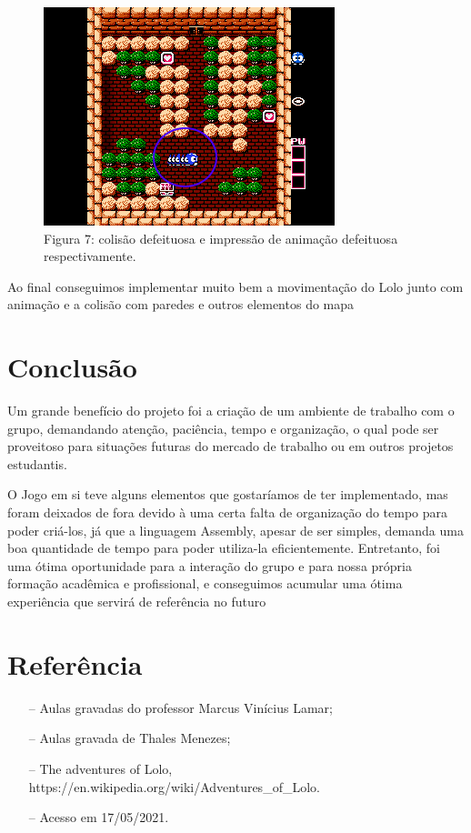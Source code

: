 \documentclass[10pt, conference, compsocconf]{IEEEtran}
\begin{document}
\begin{figure}[htb]
  \begin{center}
   \includegraphics[width=0.3\linewidth]{./Figures/image_10.png}
  \end{center}
  \caption{Figura 7: colisão defeituosa e impressão
de animação defeituosa respectivamente.}
  \label{fig:01}
\end{figure}

Ao final conseguimos implementar muito bem a movimentação do Lolo junto com animação e a colisão com
paredes e outros elementos do mapa

\section{Conclusão}
Um grande benefício do projeto foi a criação de
um ambiente de trabalho com o grupo, demandando
atenção, paciência, tempo e organização, o qual pode
ser proveitoso para situações futuras do mercado de
trabalho ou em outros projetos estudantis.

O Jogo em si teve alguns elementos que
gostaríamos de ter implementado, mas foram deixados de fora devido à uma certa falta de organização do tempo para poder criá-los, já que a linguagem
Assembly, apesar de ser simples, demanda uma boa
quantidade de tempo para poder utiliza-la eficientemente. Entretanto, foi uma ótima oportunidade
para a interação do grupo e para nossa própria formação acadêmica e profissional, e conseguimos acumular uma ótima experiência que servirá de referência no futuro


\section{Referência}
\label{sec:Conclusao}
\begin{itemize}
    \item[--] Aulas gravadas do professor Marcus Vinícius Lamar;
    \item[--] Aulas gravada de Thales Menezes;
    \item[--] The adventures of Lolo, https://en.wikipedia.org/wiki/Adventures_of_Lolo.
    \item[--] Acesso em 17/05/2021.
    
\end{itemize}



%


\end{document}
